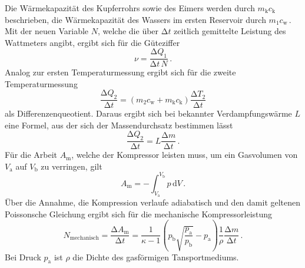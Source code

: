 Die Wärmekapazität des Kupferrohrs sowie des Eimers werden durch $m_\text{k}c_\text{k}$ beschrieben,
die Wärmekapazität des Wassers im ersten Reservoir durch $m_1c_\text{w}$\,.
Mit der neuen Variable $N$, welche die über $\increment t$ zeitlich gemittelte Leistung des 
Wattmeters angibt, ergibt sich für die Güteziffer 
\begin{equation}
    \nu=\frac{\increment Q_1}{\increment t\,N}\,.
    \label{eq:Guetereal}
\end{equation}
Analog zur ersten Temperaturmessung ergibt sich für die zweite Temperaturmessung
\begin{equation}
    \frac{\increment Q_2}{\increment t}=(m_2c_\text{w}+m_\text{k}c_\text{k})\frac{\increment T_2}{\increment t}
\end{equation}
als Differenzenqueotient. Daraus ergibt sich bei bekannter Verdampfungswärme $L$ eine Formel,
aus der sich der Massendurchsatz bestimmen lässt
\begin{equation}
    \frac{\increment Q_2}{\increment t}=L\frac{\increment m}{\increment t}\,.
    \label{eq:massendurchsatz}
\end{equation}
Für die Arbeit $A_\text{m}$, welche der Kompressor leisten muss, um ein Gasvolumen von $V_\text{a}$
auf $V_\text{b}$ zu verringen, gilt 
\begin{equation*}
    A_\text{m}=-\int_{V_\text{a}}^{V_\text{b}}p \,\text{d} V\,.
\end{equation*}
Über die Annahme, die Kompression verlaufe adiabatisch und den damit geltenen Poissonsche Gleichung
ergibt sich für die mechanische Kompressorleistung
\begin{equation}
N_\text{mechanisch}=\frac{\increment A_\text{m}}{\increment t}=\frac{1}{\kappa-1}\left(p_\text{b}
\sqrt{\frac{p_\text{a}}{p_\text{b}}}-p_\text{a}\right)\frac{1}{\rho}\frac{\increment m}{\increment t}\,.
\label{eq:mechanisch}
\end{equation}
Bei Druck $p_\text{a}$ ist $\rho$ die Dichte des gasförmigen Tansportmediums.

